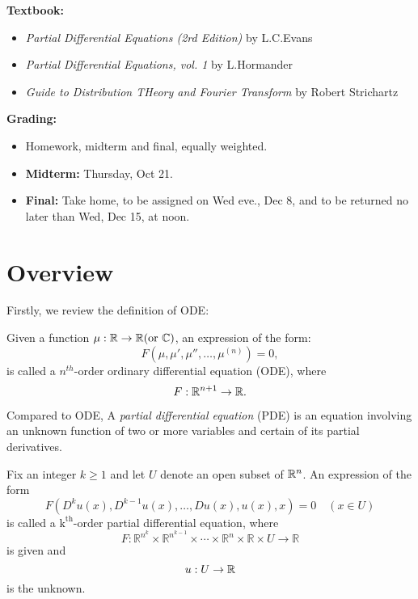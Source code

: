 \noindent
\textbf{Textbook:}
\begin{itemize}
    \item {\it Partial Differential Equations (2rd Edition)} by L.C.Evans
    \item {\it Partial Differential Equations, vol. 1} by L.Hormander
    \item {\it Guide to Distribution THeory and Fourier Transform} by Robert Strichartz
\end{itemize}

\noindent
\textbf{Grading:}
\begin{itemize}
    \item Homework, midterm and final, equally weighted.
    \item \textbf{Midterm:} Thursday, Oct 21.
    \item \textbf{Final:} Take home, to be assigned on Wed eve., Dec 8, and to be returned no later than Wed, Dec 15, at noon.
\end{itemize}

\section{Overview}
Firstly, we review the definition of ODE:
\begin{definition}
    [ODE]
    Given a function $\mu:\mathbb{R} \to \mathbb{R}( \text{or }\mathbb{C})$, an expression of the form:
    \[
        F(\mu,\mu', \mu'',\ldots, \mu^{(n)} ) = 0,    
    \]
    is called a $n^{th}$-order ordinary differential equation (ODE), where 
    \[
        F:\mathbb{R}^{n+1} \to \mathbb{R}.    
    \]
\end{definition}

Compared to ODE, A {\it partial differential equation} (PDE) is an equation involving an unknown function of two or more variables and certain of its partial derivatives.

\begin{definition}
[ODE]
Fix an integer $k\ge 1$ and let $U$ denote an open subset of $\mathbb{R}^n$. An expression of the form
\begin{equation}
\label{def:PDE}
F\left(D^{k} u(x), D^{k-1} u(x), \ldots, D u(x), u(x), x\right)=0 \quad(x \in U)
\end{equation}
is called a $\mathrm{k}^{\mathrm{th}}$-order partial differential equation, where
$$
F: \mathbb{R}^{n^{k}} \times \mathbb{R}^{n^{k-1}} \times \cdots \times \mathbb{R}^{n} \times \mathbb{R} \times U \rightarrow \mathbb{R}
$$
is given and 
\[
    u:U\to \mathbb{R}    
\]
is the unknown.
\end{definition}

